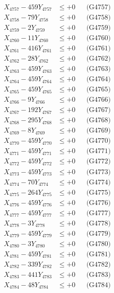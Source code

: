 \documentclass[a4paper,10pt]{article}
\begin{document}
{\begin{align}
X_{4757} - 459Y_{4757} &\leq +0 && \text{(G4757)} \\
X_{4758} - 79Y_{4758} &\leq +0 && \text{(G4758)} \\
X_{4759} - 2Y_{4759} &\leq +0 && \text{(G4759)} \\
X_{4760} - 11Y_{4760} &\leq +0 && \text{(G4760)} \\
\allowbreak
X_{4761} - 416Y_{4761} &\leq +0 && \text{(G4761)} \\
X_{4762} - 28Y_{4762} &\leq +0 && \text{(G4762)} \\
X_{4763} - 459Y_{4763} &\leq +0 && \text{(G4763)} \\
X_{4764} - 459Y_{4764} &\leq +0 && \text{(G4764)} \\
X_{4765} - 459Y_{4765} &\leq +0 && \text{(G4765)} \\
X_{4766} - 9Y_{4766} &\leq +0 && \text{(G4766)} \\
X_{4767} - 192Y_{4767} &\leq +0 && \text{(G4767)} \\
X_{4768} - 295Y_{4768} &\leq +0 && \text{(G4768)} \\
X_{4769} - 8Y_{4769} &\leq +0 && \text{(G4769)} \\
X_{4770} - 459Y_{4770} &\leq +0 && \text{(G4770)} \\
\allowbreak
X_{4771} - 459Y_{4771} &\leq +0 && \text{(G4771)} \\
X_{4772} - 459Y_{4772} &\leq +0 && \text{(G4772)} \\
X_{4773} - 459Y_{4773} &\leq +0 && \text{(G4773)} \\
X_{4774} - 70Y_{4774} &\leq +0 && \text{(G4774)} \\
X_{4775} - 264Y_{4775} &\leq +0 && \text{(G4775)} \\
X_{4776} - 459Y_{4776} &\leq +0 && \text{(G4776)} \\
X_{4777} - 459Y_{4777} &\leq +0 && \text{(G4777)} \\
X_{4778} - 3Y_{4778} &\leq +0 && \text{(G4778)} \\
X_{4779} - 459Y_{4779} &\leq +0 && \text{(G4779)} \\
X_{4780} - 3Y_{4780} &\leq +0 && \text{(G4780)} \\
\allowbreak
X_{4781} - 459Y_{4781} &\leq +0 && \text{(G4781)} \\
X_{4782} - 339Y_{4782} &\leq +0 && \text{(G4782)} \\
X_{4783} - 441Y_{4783} &\leq +0 && \text{(G4783)} \\
X_{4784} - 48Y_{4784} &\leq +0 && \text{(G4784)} \\

\end{align}}
\end{document}
